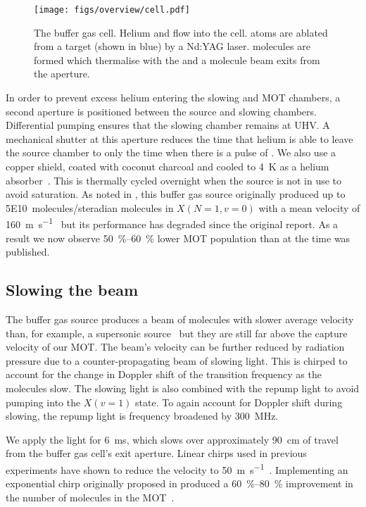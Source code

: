 \begin{figure}
  \centering
  \texttt{[image: figs/overview/cell.pdf]}
  \caption{The buffer gas cell. Helium and \SFsix flow into the cell. \Ca{}
  atoms are ablated from a target (shown in blue) by a Nd:YAG laser. \CaF{} molecules are
formed which thermalise with the \He{} and a molecule beam exits from the aperture.}
  \label{overview:fig:source}
\end{figure}

In order to prevent excess helium entering the slowing and MOT chambers, a
second aperture is positioned between the source and slowing chambers.
Differential pumping ensures that the slowing chamber remains at UHV. A
mechanical shutter at this aperture reduces the time that helium is able to
leave the source chamber to only the time when there is a pulse of \CaF{}. We
also use a copper shield, coated with coconut charcoal and cooled to
\SI{4}{\kelvin} as a helium absorber~\cite{doi:10.1116/1.574141}. This is
thermally cycled overnight when the source is not in use to avoid saturation.
As noted in , this buffer gas source originally
produced up to \SI{5E10}{molecules/steradian} molecules in $X(N=1, v=0)$ with a
mean velocity of \SI{160}{\meter\per\second}~\cite{Truppe2018} but its
performance has degraded since the original report. As a result we now observe
\SIrange{50}{60}{\percent} lower MOT population than at the time
 was published.

\subsection*{Slowing the beam}

The buffer gas source produces a beam of molecules with slower average velocity
than, for example, a supersonic source~\cite{Mathavan2016} but they are still
far above the capture velocity of our MOT. The beam's velocity can be further
reduced by radiation pressure due to a counter-propagating beam of
 slowing light. This is chirped to account for the change in
Doppler shift of the transition frequency as the molecules slow. The slowing
light is also combined with the  repump light to avoid pumping
into the $X(v=1)$ state. To again account for Doppler shift during slowing, the
repump light is frequency broadened by \SI{300}{\mega\hertz}.

We apply the light for \SI{6}{\milli\second}, which slows over approximately
\SI{90}{\centi\meter} of travel from the buffer gas cell's exit aperture.
Linear chirps used in previous experiments have shown to reduce the velocity to
\SI{50}{\meter\per\second}~\cite{Truppe2017a}. Implementing an
exponential chirp originally proposed in   produced a
\SIrange{60}{80}{\percent} improvement in the number of molecules in the
MOT~\cite{Jurgilas2021}.

